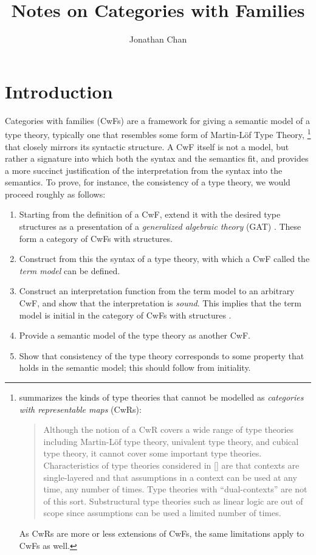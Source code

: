 \documentclass{article}
\title{Notes on Categories with Families}
\author{Jonathan Chan}
\date{}
\renewcommand{\_}{\textrm{\textscale{.5}{\textunderscore}}}
\newlength{\punctwidth}
\newcommand{\punctstack}[1]{#1%
  \settowidth{\punctwidth}{#1}%
  \hspace*{-\the\punctwidth}%
}
\theoremstyle{definition}
\theoremstyle{plain}
\begin{document}
\maketitle

\tableofcontents
\clearpage

\section{Introduction}

Categories with families (CwFs) \citep{itt} are a framework for giving a semantic model of a type theory,
typically one that resembles some form of Martin-L\"of Type Theory\punctstack{,}%
\footnote{\citet{actt} summarizes the kinds of type theories that cannot be modelled as \emph{categories with representable maps} (CwRs):
\begin{quote}
    Although the notion of a CwR covers a wide range of type theories including Martin-L\"of type theory,
    univalent type theory, and cubical type theory, it cannot cover some important type theories.
    Characteristics of type theories considered in [\citet{actt}] are that contexts are single-layered
    and that assumptions in a context can be used at any time, any number of times.
    Type theories with “dual-contexts” are not of this sort.
    Substructural type theories such as linear logic are out of scope since assumptions can be used a limited number of times.
\end{quote}
As CwRs are more or less extensions of CwFs, the same limitations apply to CwFs as well.}
that closely mirrors its syntactic structure.
A CwF itself is not a model,
but rather a signature into which both the syntax and the semantics fit,
and provides a more succinct justification of the interpretation from the syntax into the semantics.
To prove, for instance, the consistency of a type theory,
we would proceed roughly as follows:

\begin{enumerate}
    \item Starting from the definition of a CwF,
    extend it with the desired type structures as a presentation of
    a \emph{generalized algebraic theory} (GAT) \citep{gat}.
    These form a category of CwFs with structures.
    \item Construct from this the syntax of a type theory,
    with which a CwF called the \emph{term model} can be defined.
    \item Construct an interpretation function from the term model to an arbitrary CwF,
    and show that the interpretation is \emph{sound}.
    This implies that the term model is initial in the category of CwFs with structures \citep{gatcwf}.
    \item Provide a semantic model of the type theory as another CwF.
    \item Show that consistency of the type theory corresponds to some property that holds in the semantic model;
    this should follow from initiality.
\end{enumerate}
\end{document}
